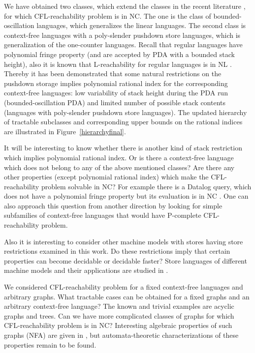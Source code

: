 \documentclass{ws-ijfcs}
\begin{document}
We have obtained two classes, which extend the classes in the recent literature \cite{ChainQ, labelledGraphs, LReach, Regularrealizability, Ullman}, for which CFL-reachability problem is in NC. The one is the class of bounded-oscillation languages, which generalizes the linear languages. The second class is context-free languages with a poly-slender pushdown store languages, which is generalization of the one-counter languages. Recall that regular languages have polynomial fringe property (and are accepted by PDA with a bounded stack height), also it is known that L-reachability for regular languages is in NL \cite{LReach, Yannakakis}. Thereby it has been demonstrated that some natural restrictions on the pushdown storage implies polynomial rational index for the corresponding context-free languages: low variability of stack height during the PDA run (bounded-oscillation PDA) and limited number of possible stack contents (languages with poly-slender pushdown store languages). The updated hierarchy of tractable subclasses and corresponding upper bounds on the rational indices are illustrated in Figure~\ref{hierarchyfinal}.


It will be interesting to know whether there is another kind of stack restriction which implies polynomial rational index. Or is there a context-free language which does not belong to any of the above mentioned classes? Are there any other properties (except polynomial rational index) which make the CFL-reachability problem solvable in NC? For example there is a Datalog query, which does not have a polynomial fringe property but its evaluation is in NC \cite{Kanellakis}. One can also approach this question from another direction by looking for simple subfamilies of context-free languages that would have P-complete CFL-reachability problem.


Also it is interesting to consider other machine models with stores having store restrictions examined in this work. Do these restrictions imply that certain properties can become decidable or decidable faster? Store languages of different machine models and their applications are studied in \cite{ Ibarra2018OnSL, IBARRA201928}.


We considered CFL-reachability problem for a fixed context-free languages and arbitrary graphs. What tractable cases can be obtained for a fixed graphs and an arbitrary context-free language? The known and trivial examples are acyclic graphs and trees. Can we have more complicated classes of graphs for which CFL-reachability problem is in NC? Interesting algebraic properties of such graphs (NFA) are given in \cite{ganardi2016circuit}, but automata-theoretic characterizations of these properties remain to be found.
\end{document}
